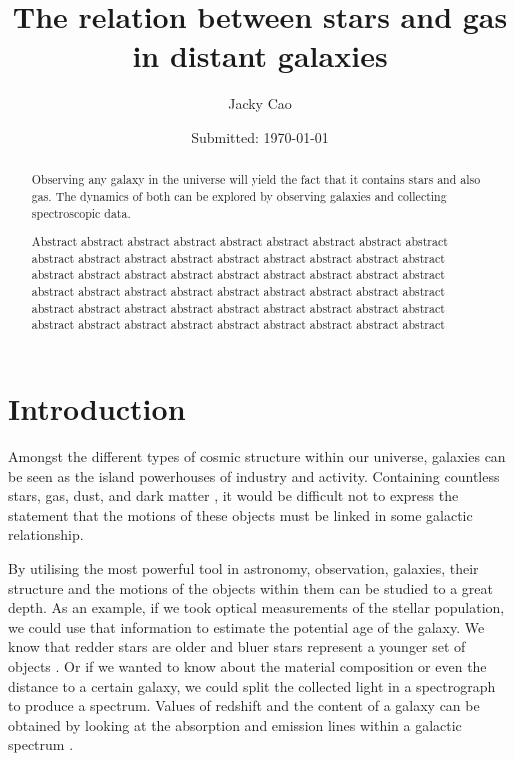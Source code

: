 \documentclass[12pt, twocolumn]{revtex4}    %
\begin{document}
                     


\title{The relation between stars and gas in distant galaxies} 
\date{Submitted: \today{}}
\author{Jacky Cao}

\begin{abstract}              
 
 Observing any galaxy in the universe will yield the fact that it contains stars and also gas. The dynamics of both can be explored by observing galaxies and collecting spectroscopic data. 
 
Abstract abstract abstract abstract abstract abstract abstract abstract abstract abstract abstract abstract abstract abstract abstract abstract abstract abstract abstract abstract abstract abstract abstract abstract abstract abstract abstract abstract abstract abstract abstract abstract abstract abstract abstract abstract abstract abstract abstract abstract abstract abstract abstract abstract abstract abstract abstract abstract abstract abstract abstract abstract abstract abstract 

\end{abstract}


\maketitle

\tableofcontents

\newpage

\section{Introduction} 

Amongst the different types of cosmic structure within our universe, galaxies can be seen as the island powerhouses of industry and activity. Containing countless stars, gas, dust, and dark matter \cite{carroll_astro}, it would be difficult not to express the statement that the motions of these objects must be linked in some galactic relationship. 

By utilising the most powerful tool in astronomy, observation, galaxies, their structure and the motions of the objects within them can be studied to a great depth. As an example, if we took optical measurements of the stellar population, we could use that information to estimate the potential age of the galaxy. We know that redder stars are older and bluer stars represent a younger set of objects \cite{carroll_astro}. Or if we wanted to know about the material composition or even the distance to a certain galaxy, we could split the collected light in a spectrograph to produce a spectrum. Values of redshift and the content of a galaxy can be obtained by looking at the absorption and emission lines within a galactic spectrum \cite{carroll_astro}.
\end{document}
